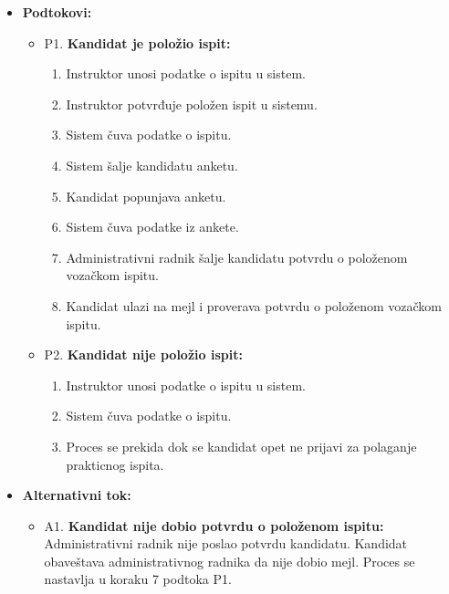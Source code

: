 \begin{itemize}
\begin{enumerate}
   \end{enumerate}

\item \textbf{Podtokovi:}   
 \begin{itemize}
   \item P1. \textbf{Kandidat je položio ispit:}
   \begin{enumerate}
       \item Instruktor unosi podatke o ispitu u sistem.
       \item Instruktor potvrđuje položen ispit u sistemu.
       \item Sistem čuva podatke o ispitu.
       \item Sistem šalje kandidatu anketu.
       \item Kandidat popunjava anketu.
       \item Sistem čuva podatke iz ankete.
       \item Administrativni radnik šalje kandidatu potvrdu o položenom vozačkom ispitu.
       \item Kandidat ulazi na mejl i proverava potvrdu o položenom vozačkom ispitu.
   \end{enumerate}
   \item P2. \textbf{Kandidat nije položio ispit:}
   \begin{enumerate}
       \item Instruktor unosi podatke o ispitu u sistem.
       \item Sistem čuva podatke o ispitu.
       \item Proces se prekida dok se kandidat opet ne prijavi za polaganje prakticnog ispita.
   \end{enumerate}
  
   \end{itemize}

\item \textbf{Alternativni tok:}  
   \begin{itemize} 
     \item A1. \textbf{Kandidat nije dobio potvrdu o položenom ispitu:}
     Administrativni radnik nije poslao potvrdu kandidatu. Kandidat obaveštava administrativnog radnika da nije dobio mejl. Proces se nastavlja u koraku 7 podtoka P1.
   \end{itemize}

\end{itemize}  

